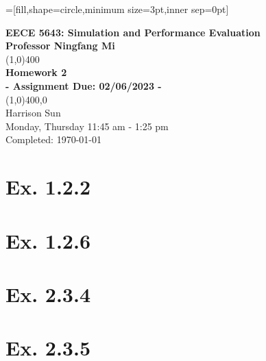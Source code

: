 \documentclass[11]{article}
\begin{document}
=[fill,shape=circle,minimum size=3pt,inner sep=0pt]

\begin{titlepage}
\begin{center}
\vspace*{2cm}
\Large{\textbf{EECE 5643: Simulation and Performance Evaluation}}\\
\Large{\textbf{Professor Ningfang Mi}}\\
\vfill
\line(1,0){400}\\[1mm]
\huge{\textbf{Homework 2}}\\[3mm]
\Large{\textbf{- Assignment Due: 02/06/2023 -}}\\[1mm]
\line(1,0){400,0}\\
\vfill
Harrison Sun\\
Monday, Thursday 11:45 am - 1:25 pm \\
Completed: \today\
\end{center}
\end{titlepage}

\section{\textbf{Ex. 1.2.2}}




\pagebreak

\section{\textbf{Ex. 1.2.6}}



\pagebreak

\section{\textbf{Ex. 2.3.4}}



\pagebreak

\section{\textbf{Ex. 2.3.5}}


\end{document}
